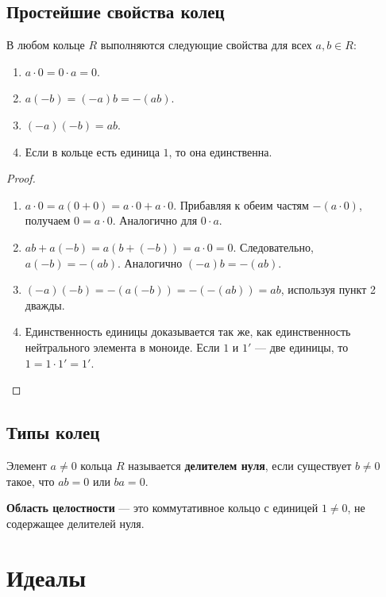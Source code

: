 \documentclass[10pt]{article}
\begin{document}
\subsection{Простейшие свойства колец}
\begin{stat}
В любом кольце $R$ выполняются следующие свойства для всех $a, b \in R$:
\begin{enumerate}
    \item $a \cdot 0 = 0 \cdot a = 0$.
    \item $a(-b) = (-a)b = -(ab)$.
    \item $(-a)(-b) = ab$.
    \item Если в кольце есть единица $1$, то она единственна.
\end{enumerate}
\end{stat}
\begin{proof}
\begin{enumerate}
    \item $a \cdot 0 = a(0+0) = a \cdot 0 + a \cdot 0$. Прибавляя к обеим частям $-(a \cdot 0)$, получаем $0 = a \cdot 0$. Аналогично для $0 \cdot a$.
    \item $ab + a(-b) = a(b + (-b)) = a \cdot 0 = 0$. Следовательно, $a(-b) = -(ab)$. Аналогично $(-a)b = -(ab)$.
    \item $(-a)(-b) = -(a(-b)) = -(-(ab)) = ab$, используя пункт 2 дважды.
    \item Единственность единицы доказывается так же, как единственность нейтрального элемента в моноиде. Если $1$ и $1'$ — две единицы, то $1 = 1 \cdot 1' = 1'$.
\end{enumerate}
\end{proof}

\subsection{Типы колец}
\begin{definition}
Элемент $a \neq 0$ кольца $R$ называется \textbf{делителем нуля}, если существует $b \neq 0$ такое, что $ab = 0$ или $ba = 0$.
\end{definition}

\begin{definition}
\textbf{Область целостности} — это коммутативное кольцо с единицей $1 \neq 0$, не содержащее делителей нуля.
\end{definition}


\section{Идеалы}
\end{document}
